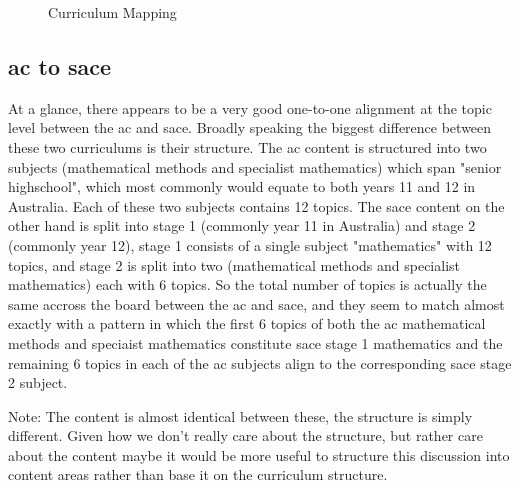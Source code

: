 \documentclass[twoside,12pt,a4paper]{report}
\begin{document}
\begin{figure}[p]
\begin{center}

\caption{Curriculum Mapping\label{fig:mapping}}
\end{center}
\end{figure}

\subsection{\gls{ac} to \gls{sace}}

At a glance, there appears to be a very good one-to-one alignment at the topic level between the \gls{ac} and \gls{sace}. Broadly speaking the biggest difference between these two curriculums is their structure. The \gls{ac} content is structured into two subjects (mathematical methods and specialist mathematics) which span "senior highschool", which most commonly would equate to both years 11 and 12 in Australia. Each of these two subjects contains 12 topics. The \gls{sace} content on the other hand is split into stage 1 (commonly year 11 in Australia) and stage 2 (commonly year 12), stage 1 consists of a single subject "mathematics" with 12 topics, and stage 2 is split into two (mathematical methods and specialist mathematics) each with 6 topics. So the total number of topics is actually the same accross the board between the \gls{ac} and \gls{sace}, and they seem to match almost exactly with a pattern in which the first 6 topics of both the \gls{ac} mathematical methods and speciaist mathematics constitute \gls{sace} stage 1 mathematics and the remaining 6 topics in each of the \gls{ac} subjects align to the corresponding \gls{sace} stage 2 subject.

Note: The content is almost identical between these, the structure is simply different. Given how we don't really care about the structure, but rather care about the content maybe it would be more useful to structure this discussion into content areas rather than base it on the curriculum structure.
\end{document}
